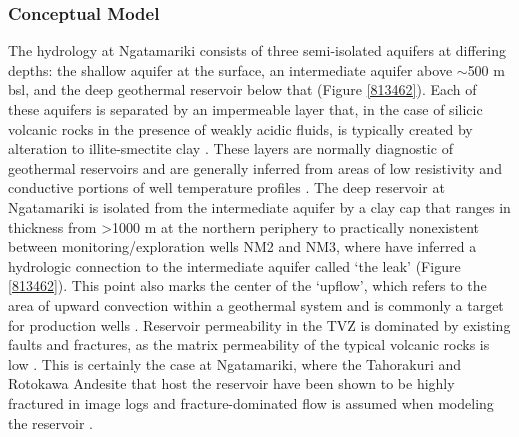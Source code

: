 \subsubsection{Conceptual Model}
The hydrology at Ngatamariki consists of three semi-isolated aquifers at differing depths: the shallow aquifer at the surface, an intermediate aquifer above $\sim$500 m bsl, and the deep geothermal reservoir below that \citep{Boseley_2010,Chambefort_2016} (Figure \ref{813462}). Each of these aquifers is separated by an impermeable layer that, in the case of silicic volcanic rocks in the presence of weakly acidic fluids, is typically created by alteration to illite-smectite clay \citep{Boseley_2010}. These layers are normally diagnostic of geothermal reservoirs and are generally inferred from areas of low resistivity \citep[e.g.][]{Bibby_1995} and conductive portions of well temperature profiles \citep{Grant_2011}. The deep reservoir at Ngatamariki is isolated from the intermediate aquifer by a clay cap that ranges in thickness from \textgreater1000 m at the northern periphery to practically nonexistent between monitoring\slash{exploration} wells NM2 and NM3, where \citet{Boseley_2010} have inferred a hydrologic connection to the intermediate aquifer called `the leak' (Figure \ref{813462}). This point also marks the center of the `upflow', which refers to the area of upward convection within a geothermal system and is commonly a target for production wells \citep{Grant_2011}. Reservoir permeability in the TVZ is dominated by existing faults and fractures, as the matrix permeability of the typical volcanic rocks is low \citep{Grant_2011,Cant_2018}. This is certainly the case at Ngatamariki, where the Tahorakuri and Rotokawa Andesite that host the reservoir have been shown to be highly fractured in image logs \citep{nm09_report,nm10_report,massiot_2012} and fracture-dominated flow is assumed when modeling the reservoir \citep[e.g.][]{Quinao_2018}.

